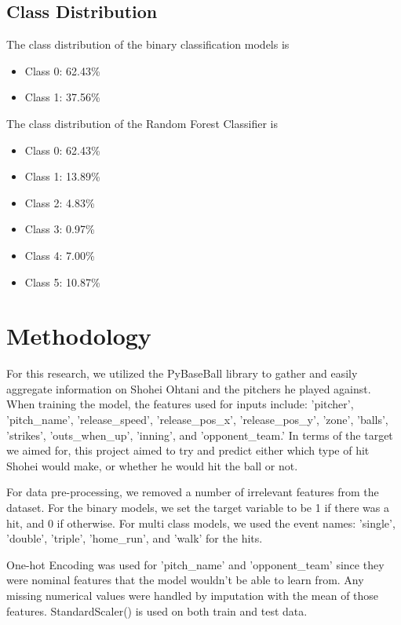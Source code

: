 \documentclass[conference]{IEEEtran}
\begin{document}
\subsection{Class Distribution}
The class distribution of the binary classification models is 
\begin{itemize}
    \item Class 0: 62.43\%
    \item Class 1: 37.56\%
\end{itemize}

The class distribution of the Random Forest Classifier is

\begin{itemize}
    \item Class 0: 62.43\%
    \item Class 1: 13.89\%
    \item Class 2: 4.83\%
    \item Class 3: 0.97\%
    \item Class 4: 7.00\%
    \item Class 5: 10.87\%
\end{itemize}


\section{Methodology}
For this research, we utilized the PyBaseBall library to gather and easily aggregate information on Shohei Ohtani and the pitchers he played against. When training the model, the features used for inputs include: 'pitcher', 'pitch\_name', 'release\_speed', 'release\_pos\_x', 'release\_pos\_y', 'zone', 'balls', 'strikes', 'outs\_when\_up', 'inning', and 'opponent\_team.' In terms of the target we aimed for, this project aimed to try and predict either which type of hit Shohei would make, or whether he would hit the ball or not. 

For data pre-processing, we removed a number of irrelevant features from the dataset. For the binary models, we set the target variable to be 1 if there was a hit, and 0 if otherwise. For multi class models, we used the event names: 'single', 'double', 'triple', 'home\_run', and 'walk' for the hits. 

One-hot Encoding was used for 'pitch\_name' and 'opponent\_team' since they were nominal features that the model wouldn't be able to learn from. Any missing numerical values were handled by imputation with the mean of those features. StandardScaler() is used on both train and test data.
\end{document}

